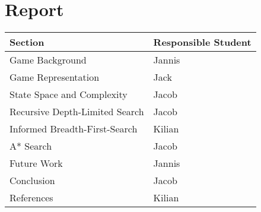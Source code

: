 \documentclass[a4paper,10pt]{article}
\begin{document}
\section*{\large{Report}}
\begin{table}[!ht]
\centering
\begin{tabular}{l|l} \hline
    \textbf{Section} & \textbf{Responsible Student} \\ \hline
    Game Background & Jannis \\
    Game Representation & Jack \\
    State Space and Complexity & Jacob \\
    Recursive Depth-Limited Search & Jacob \\
    Informed Breadth-First-Search & Kilian \\
    A* Search & Jacob \\
    Future Work & Jannis \\
    Conclusion & Jacob \\
    References & Kilian \\
\end{tabular}
\end{table}
\end{document}

